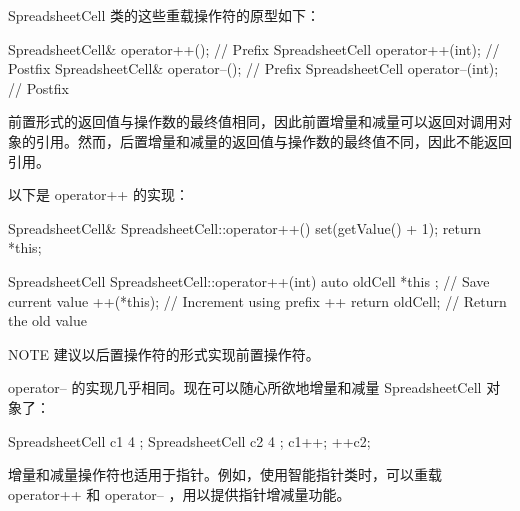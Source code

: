 SpreadsheetCell 类的这些重载操作符的原型如下：

\begin{cpp}
SpreadsheetCell& operator++(); // Prefix
SpreadsheetCell operator++(int); // Postfix
SpreadsheetCell& operator--(); // Prefix
SpreadsheetCell operator--(int); // Postfix
\end{cpp}

前置形式的返回值与操作数的最终值相同，因此前置增量和减量可以返回对调用对象的引用。然而，后置增量和减量的返回值与操作数的最终值不同，因此不能返回引用。

以下是 operator++ 的实现：

\begin{cpp}
SpreadsheetCell& SpreadsheetCell::operator++()
{
    set(getValue() + 1);
    return *this;
}

SpreadsheetCell SpreadsheetCell::operator++(int)
{
    auto oldCell { *this }; // Save current value
    ++(*this); // Increment using prefix ++
    return oldCell; // Return the old value
}
\end{cpp}

\begin{myNotic}{NOTE}
建议以后置操作符的形式实现前置操作符。
\end{myNotic}

operator-- 的实现几乎相同。现在可以随心所欲地增量和减量 SpreadsheetCell 对象了：

\begin{cpp}
SpreadsheetCell c1 { 4 };
SpreadsheetCell c2 { 4 };
c1++;
++c2;
\end{cpp}

增量和减量操作符也适用于指针。例如，使用智能指针类时，可以重载 operator++ 和 operator-- ，用以提供指针增减量功能。



